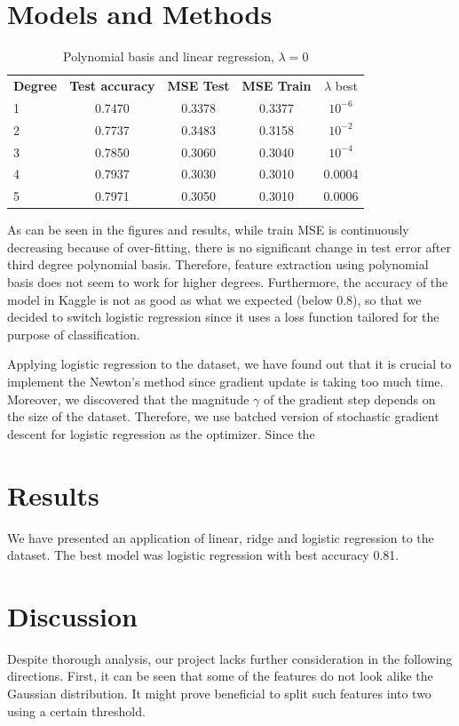 \documentclass[10pt,conference,compsocconf]{IEEEtran}
\begin{document}
\section{Models and Methods}
\begin{table}[!htb]
	\caption{Polynomial basis and linear regression, $\lambda=0$}	\label{tab:degrees}
	\centering\begin{tabular}{|lcccc|}\hline
		{\bf Degree} & {\bf Test accuracy} & {\bf MSE Test} & {\bf MSE Train} & {$\lambda$ best}\\
		1 & 0.7470 & 0.3378 & 0.3377 & $10^{-6}$\\
		2 & 0.7737 & 0.3483 & 0.3158 & $10^{-2}$\\		
		3 & 0.7850 & 0.3060 & 0.3040 & $10^{-4}$\\
		4 & 0.7937 & 0.3030 & 0.3010 & 0.0004\\
		5 & 0.7971 & 0.3050 & 0.3010 & 0.0006\\\hline
	\end{tabular}
\end{table}

As can be seen in the figures and results, while train MSE is continuously decreasing because of over-fitting, there is no significant change in test error after third degree polynomial basis. Therefore, feature extraction using polynomial basis does not seem to work for higher degrees. Furthermore, the accuracy of the model in Kaggle is not as good as what we expected (below 0.8), so that we decided to switch logistic regression since it uses a loss function tailored for the purpose of classification.

Applying logistic regression to the dataset, we have found out that it is crucial to implement the Newton's method since gradient update is taking too much time. Moreover, we discovered that the magnitude $\gamma$ of the gradient step depends on the size of the dataset. Therefore, we use batched version of stochastic gradient descent for logistic regression as the optimizer. Since the 
\section{Results}
We have presented an application of linear, ridge and logistic regression to the dataset. The best model was logistic regression with best accuracy 0.81.
\section{Discussion}
Despite thorough analysis, our project lacks further consideration in the following directions. First, it can be seen that some of the features do not look alike the Gaussian distribution. It might prove beneficial to split such features into two using a certain threshold.
\end{document}

